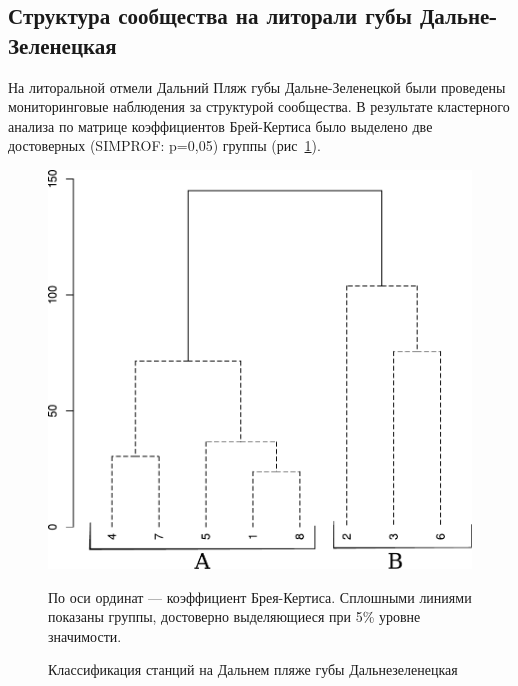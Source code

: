 
\subsection{Структура сообщества на литорали губы Дальне-Зеленецкая}
На литоральной отмели Дальний Пляж губы Дальне-Зеленецкой были проведены мониторинговые наблюдения за структурой сообщества.
В результате кластерного анализа по матрице коэффициентов Брей-Кертиса было выделено две достоверных (SIMPROF: p=0,05) группы (рис~\ref{ris:DZ_cluster_soobshestva}). 
	\begin{figure}[p]
		\begin{center}
			\includegraphics{../after_Deryuginskie/2_disser/station_bray_2002_SIMPROF_BW1.pdf}
		\end{center}
	\caption{Классификация станций на Дальнем пляже губы Дальнезеленецкая}
	\label{ris:DZ_cluster_soobshestva}

	\footnotesize{По оси ординат --- коэффициент Брея-Кертиса. Сплошными линиями показаны группы, достоверно выделяющиеся при 5\% уровне значимости.}
	\end{figure}

